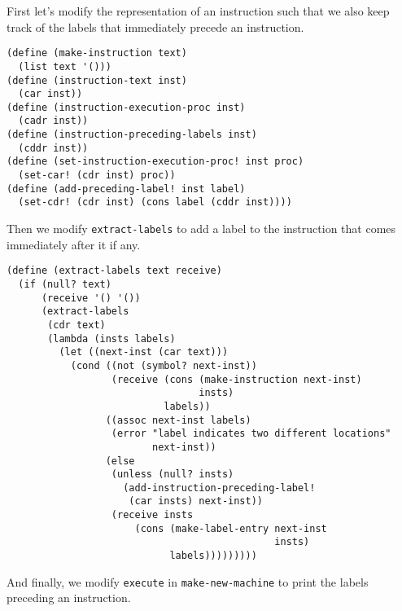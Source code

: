 \documentclass[a4paper,12pt]{article}
\begin{document}
First let's modify the representation of an instruction such that we
also keep track of the labels that immediately precede an instruction.

\begin{lstlisting}
(define (make-instruction text)
  (list text '()))
(define (instruction-text inst)
  (car inst))
(define (instruction-execution-proc inst)
  (cadr inst))
(define (instruction-preceding-labels inst)
  (cddr inst))
(define (set-instruction-execution-proc! inst proc)
  (set-car! (cdr inst) proc))
(define (add-preceding-label! inst label)
  (set-cdr! (cdr inst) (cons label (cddr inst))))
\end{lstlisting}

Then we modify \lstinline!extract-labels! to add a label to the
instruction that comes immediately after it if any.

\begin{lstlisting}
(define (extract-labels text receive)
  (if (null? text)
      (receive '() '())
      (extract-labels
       (cdr text)
       (lambda (insts labels)
         (let ((next-inst (car text)))
           (cond ((not (symbol? next-inst))
                  (receive (cons (make-instruction next-inst)
                                 insts)
                           labels))
                 ((assoc next-inst labels)
                  (error "label indicates two different locations"
                         next-inst))
                 (else
                  (unless (null? insts)
                    (add-instruction-preceding-label!
                     (car insts) next-inst))
                  (receive insts
                      (cons (make-label-entry next-inst
                                              insts)
                            labels)))))))))
\end{lstlisting}

And finally, we modify \lstinline!execute! in
\lstinline!make-new-machine! to print the labels preceding an
instruction.
\end{document}
